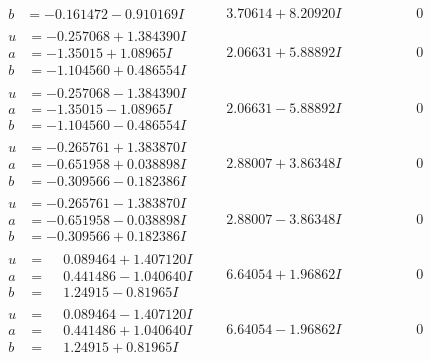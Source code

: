 \documentclass[1p]{elsarticle_modified}
\theoremstyle{definition}
\begin{document}
$$\begin{array}{c|c|c}
\begin{aligned}
b &= -0.161472 - 0.910169 I\end{aligned}
 & \phantom{-}3.70614 + 8.20920 I & \phantom{-0.000000 } 0 \\ \hline\begin{aligned}
u &= -0.257068 + 1.384390 I \\
a &= -1.35015 + 1.08965 I \\
b &= -1.104560 + 0.486554 I\end{aligned}
 & \phantom{-}2.06631 + 5.88892 I & \phantom{-0.000000 } 0 \\ \hline\begin{aligned}
u &= -0.257068 - 1.384390 I \\
a &= -1.35015 - 1.08965 I \\
b &= -1.104560 - 0.486554 I\end{aligned}
 & \phantom{-}2.06631 - 5.88892 I & \phantom{-0.000000 } 0 \\ \hline\begin{aligned}
u &= -0.265761 + 1.383870 I \\
a &= -0.651958 + 0.038898 I \\
b &= -0.309566 - 0.182386 I\end{aligned}
 & \phantom{-}2.88007 + 3.86348 I & \phantom{-0.000000 } 0 \\ \hline\begin{aligned}
u &= -0.265761 - 1.383870 I \\
a &= -0.651958 - 0.038898 I \\
b &= -0.309566 + 0.182386 I\end{aligned}
 & \phantom{-}2.88007 - 3.86348 I & \phantom{-0.000000 } 0 \\ \hline\begin{aligned}
u &= \phantom{-}0.089464 + 1.407120 I \\
a &= \phantom{-}0.441486 - 1.040640 I \\
b &= \phantom{-}1.24915 - 0.81965 I\end{aligned}
 & \phantom{-}6.64054 + 1.96862 I & \phantom{-0.000000 } 0 \\ \hline\begin{aligned}
u &= \phantom{-}0.089464 - 1.407120 I \\
a &= \phantom{-}0.441486 + 1.040640 I \\
b &= \phantom{-}1.24915 + 0.81965 I\end{aligned}
 & \phantom{-}6.64054 - 1.96862 I & \phantom{-0.000000 } 0 \\ \hline\begin{aligned}

\end{aligned}
\end{array}$$
\end{document}
